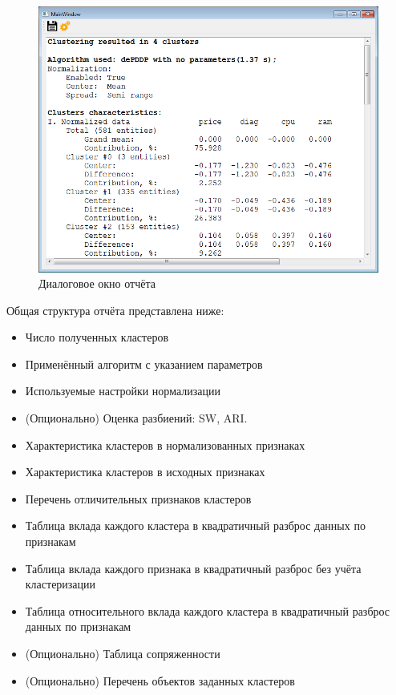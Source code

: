 \documentclass[12pt]{diploma}
\begin{document}
	\begin{figure}[h!]
		\centering
		\includegraphics[width=0.7\linewidth]{img/report-dialog}		
		\caption{Диалоговое окно отчёта}
		\label{fig:report-dialog}
	\end{figure}
	
	Общая структура отчёта представлена ниже:
	
	\begin{itemize}
		\item Число полученных кластеров
		\item Применённый алгоритм с указанием параметров
		\item Используемые настройки нормализации
		\item (Опционально) Оценка разбиений: SW, ARI.
		\item Характеристика кластеров в нормализованных признаках
		\item Характеристика кластеров в исходных признаках
		\item Перечень отличительных признаков кластеров
		\item Таблица вклада каждого кластера в квадратичный разброс данных по признакам
		\item Таблица вклада каждого признака в квадратичный разброс без учёта кластеризации
		\item Таблица относительного вклада каждого кластера в квадратичный разброс данных по признакам
		\item (Опционально) Таблица сопряженности
		\item (Опционально) Перечень объектов заданных кластеров
	\end{itemize}
	
\end{document}
